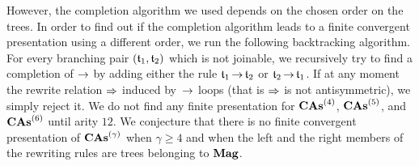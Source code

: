 However, the completion algorithm we used depends on the chosen order on
the trees. In order to find out if the completion algorithm leads to a
finite convergent presentation using a different order, we run the
following backtracking algorithm. For every branching pair
$(\mathfrak{t}_1, \mathfrak{t}_2)$ which is not joinable, we recursively try to find a
completion of $\operatorname{\to}$ by adding either the rule
$\mathfrak{t}_1 \operatorname{\to}  \mathfrak{t}_2$ or $\mathfrak{t}_2 \operatorname{\to}  \mathfrak{t}_1$.
If at any moment the rewrite relation $\operatorname{\Rightarrow}$ induced by~$\operatorname{\to}$
loops (that is $\operatorname{\Rightarrow}$ is not antisymmetric), we simply reject it.
We do not find any finite presentation for $\mathbf{CAs}^{\left(4\right)}$, $\mathbf{CAs}^{\left(5\right)}$, and
$\mathbf{CAs}^{\left(6\right)}$ until arity $12$. We conjecture that there is no finite
convergent presentation of $\mathbf{CAs}^{\left(\gamma\right)}$ when $\gamma \geq 4$ and when
 the left and the right members of the rewriting rules are trees
 belonging to $\mathbf{Mag}$.
\medbreak

